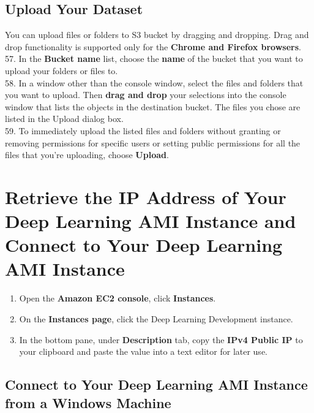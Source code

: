 \documentclass[]{book}
\providecommand{\tightlist}{%
  \setlength{\itemsep}{0pt}\setlength{\parskip}{0pt}}
\begin{document}
\hypertarget{upload-your-dataset}{%
\section{Upload Your Dataset}\label{upload-your-dataset}}

You can upload files or folders to S3 bucket by dragging and dropping. Drag and drop functionality is supported only for the \textbf{Chrome and Firefox browsers}.\\
57. In the \textbf{Bucket name} list, choose the \textbf{name} of the bucket that you want to upload your folders or files to.\\
58. In a window other than the console window, select the files and folders that you want to upload. Then \textbf{drag and drop} your selections into the console window that lists the objects in the destination bucket. The files you chose are listed in the Upload dialog box.\\
59. To immediately upload the listed files and folders without granting or removing permissions for specific users or setting public permissions for all the files that you're uploading, choose \textbf{Upload}.

\hypertarget{retrieve-the-ip-address-of-your-deep-learning-ami-instance-and-connect-to-your-deep-learning-ami-instance}{%
\chapter{Retrieve the IP Address of Your Deep Learning AMI Instance and Connect to Your Deep Learning AMI Instance}\label{retrieve-the-ip-address-of-your-deep-learning-ami-instance-and-connect-to-your-deep-learning-ami-instance}}

\begin{enumerate}
\def\labelenumi{\arabic{enumi}.}
\setcounter{enumi}{59}
\tightlist
\item
  Open the \textbf{Amazon EC2 console}, click \textbf{Instances}.
\item
  On the \textbf{Instances page}, click the Deep Learning Development instance.
\item
  In the bottom pane, under \textbf{Description} tab, copy the \textbf{IPv4 Public IP} to your clipboard and paste the value into a text editor for later use.
\end{enumerate}

\hypertarget{connect-to-your-deep-learning-ami-instance-from-a-windows-machine}{%
\section{Connect to Your Deep Learning AMI Instance from a Windows Machine}\label{connect-to-your-deep-learning-ami-instance-from-a-windows-machine}}
\end{document}
